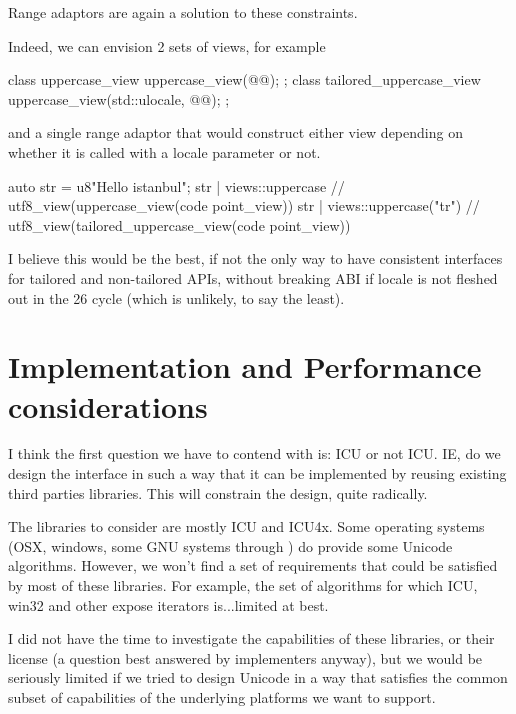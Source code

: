 \documentclass{wg21}
\begin{document}
Range adaptors are again a solution to these constraints.

Indeed, we can envision 2 sets of views, for example

\begin{colorblock}
class uppercase_view {
    uppercase_view(@@);
};
class tailored_uppercase_view {
    uppercase_view(std::ulocale, @@);
};
\end{colorblock}

and a single range adaptor  that would construct either view depending on whether it is called
with a locale parameter or not.

\begin{colorblock}
auto str = u8"Hello istanbul";
str | views::uppercase // utf8_view(uppercase_view(code point_view))
str | views::uppercase("tr") // utf8_view(tailored_uppercase_view(code point_view))
\end{colorblock}

I believe this would be the best, if not the only way to have consistent interfaces for tailored and non-tailored APIs,
without breaking ABI if locale is not fleshed out in the 26 cycle (which is unlikely, to say the least).

\section{Implementation and Performance considerations}

I think the first question we have to contend with is: ICU or not ICU.
IE, do we design the interface in such a way that it can be implemented by reusing existing third parties libraries.
This will constrain the design, quite radically.

The libraries to consider are mostly ICU and ICU4x. Some operating systems (OSX, windows, some GNU systems through ) do provide some Unicode algorithms.
However, we won't find a set of requirements that could be satisfied by most of these libraries. For example, the set of algorithms for which ICU, win32 and other expose iterators is...limited at best.

I did not have the time to investigate the capabilities of these libraries, or their license (a question best answered by implementers anyway), but we would be seriously limited if we tried to
design Unicode in a way that satisfies the common subset of capabilities of the underlying platforms we want to support.
\end{document}
